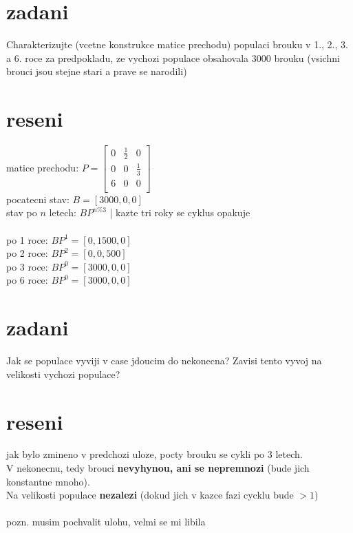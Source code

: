 \documentclass[a4paper]{article}
\begin{document}
\section*{zadani}
Charakterizujte (vcetne konstrukce matice prechodu)
populaci brouku v 1., 2., 3. a 6. roce za predpokladu,
ze vychozi populace obsahovala 3000 brouku (vsichni brouci
jsou stejne stari a prave se narodili)

\section*{reseni}
matice prechodu: $
P=
\begin{bmatrix}
	0 & \frac{1}{2} & 0\\
	0 & 0 & \frac{1}{3}\\
	6 & 0 & 0 \\
\end{bmatrix}
$\\
pocatecni stav: $B=[3000, 0, 0]$\\
stav po $n$ letech: $BP^{n\%3}$ | kazte tri roky se cyklus opakuje\\
\\
po 1 roce:  $BP^{1} = [0,1500,0]$\\
po 2 roce:  $BP^{2} = [0,0,500]$\\
po 3 roce:  $BP^{0} = [3000,0,0]$\\
po 6 roce:  $BP^{0} = [3000,0,0]$\\









\section*{zadani}
Jak se populace vyviji v case jdoucim do nekonecna?
Zavisi tento vyvoj na velikosti vychozi populace?

\section*{reseni}
jak bylo zmineno v predchozi uloze,
pocty brouku se cykli po 3 letech.\\
V nekonecnu, tedy brouci \textbf{nevyhynou, ani se nepremnozi}
(bude jich konstantne mnoho).\\
Na velikosti populace \textbf{nezalezi}
(dokud jich v kazce fazi cycklu bude $>1$)
\\\\
pozn. musim pochvalit ulohu, velmi se mi libila
\end{document}
